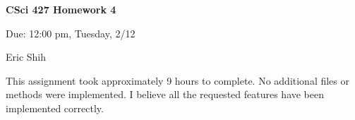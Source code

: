 \documentclass[11pt]{article}
\begin{document}
\begin{LARGE}
\centerline {\bf CSci 427 Homework 4}
\end{LARGE}
\vskip 0.25cm

\centerline{Due: 12:00 pm, Tuesday, 2/12}
\centerline{Eric Shih}

\setlength{\parindent}{1cm}
\indent This assignment took approximately 9 hours to complete. No additional files or methods were implemented. I believe all the
	requested features have been implemented correctly.
\end{document}

